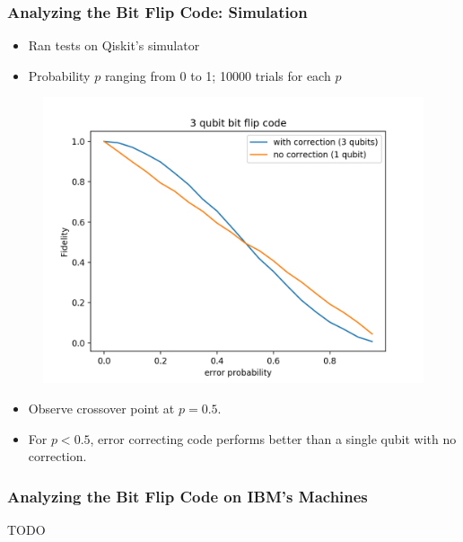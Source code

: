\documentclass{beamer}
\begin{document}
\begin{frame}
    \frametitle{Analyzing the Bit Flip Code: Simulation}
    \begin{itemize}
        \item Ran tests on Qiskit's simulator
        \item Probability $p$ ranging from 0 to 1; 10000 trials for each $p$
    \end{itemize}
    \begin{minipage}{0.45\textwidth}
        \begin{figure}[H]
        \includegraphics[scale=0.4]{3qb-bf-overlay copy.png}
        \end{figure}
        \end{minipage} \hfill
        \begin{minipage}{0.45\textwidth}
        \begin{itemize}
        \item Observe crossover point at $p=0.5$.
        \item For $p<0.5$, error correcting code performs better than a single qubit with no correction.
        \end{itemize}
    \end{minipage}
\end{frame}

\begin{frame}
    \frametitle{Analyzing the Bit Flip Code on IBM's Machines}
    TODO
    
\end{frame}
\end{document}
